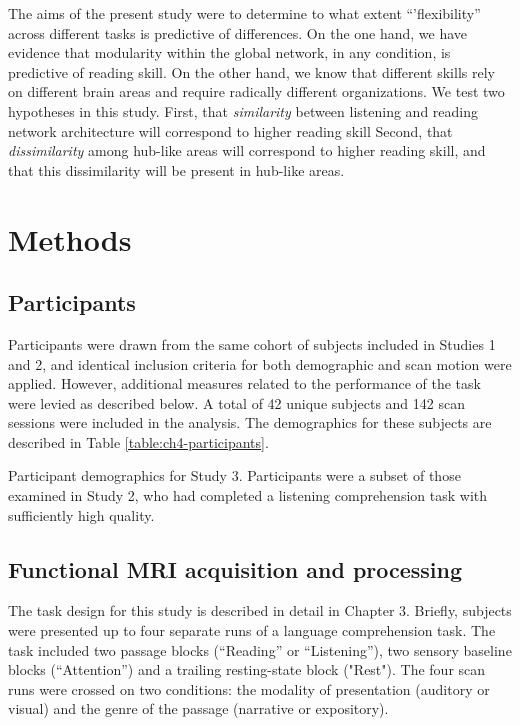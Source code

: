 The aims of the present study were to determine to what extent ``'flexibility'' across different tasks is predictive of differences. On the one hand, we have evidence that modularity within the global network, in any condition, is predictive of reading skill. On the other hand, we know that different skills rely on different brain areas and require radically different organizations. We test two hypotheses in this study. First, that \textit{similarity} between listening and reading network architecture will correspond to higher reading skill Second, that \textit{dissimilarity} among hub-like areas will correspond to higher reading skill, and that this dissimilarity will be present in hub-like areas. 

\section{Methods}

\subsection{Participants}

Participants were drawn from the same cohort of subjects included in Studies 1 and 2, and identical inclusion criteria for both demographic and scan motion were applied. However, additional measures related to the performance of the task were levied as described below. A total of 42 unique subjects and 142 scan sessions were included in the analysis. The demographics for these subjects are described in Table \ref{table:ch4-participants}.

\begin{table}[t]
	\renewcommand{\tabcolsep}{0.09cm}
	\centering
	
	\caption[Participant demographics for Study 3.]{Participant demographics for Study 3. Participants were a subset of those examined in Study 2, who had completed a listening comprehension task with sufficiently high quality.}
	\label{table:ch4-participants}
\end{table}

\subsection{Functional MRI acquisition and processing}

The task design for this study is described in detail in Chapter 3. Briefly, subjects were presented up to four separate runs of a language comprehension task. The task included two passage blocks (``Reading'' or ``Listening''), two sensory baseline blocks (``Attention'') and a trailing resting-state block ("Rest"). The four scan runs were crossed on two conditions: the modality of presentation (auditory or visual) and the genre of the passage (narrative or expository). 

